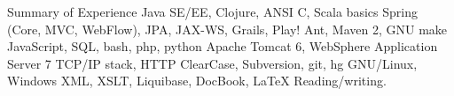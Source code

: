 \begin{rubric}{Summary of Experience}
   Java SE/EE, Clojure, ANSI C, Scala basics
  \entry*[Frameworks] Spring (Core, MVC, WebFlow), JPA, JAX-WS, Grails, Play!
   Ant, Maven 2, GNU make
  \entry*[Scripting] JavaScript, SQL, bash, php, python
  \entry*[Servers] Apache Tomcat 6, WebSphere Application Server 7
  \entry*[Protocols] TCP/IP stack, HTTP
  \entry*[VCS] ClearCase, Subversion, git, hg
  \entry*[OS] GNU/Linux, Windows
  \entry*[Other] XML, XSLT, Liquibase, DocBook, \LaTeX
  \entry*[English] Reading/writing.
\end{rubric}
